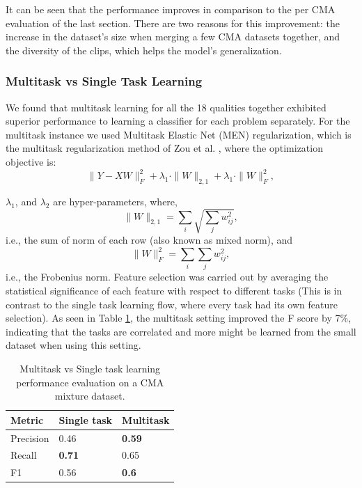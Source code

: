 \documentclass[11pt,twocolumn,varwidth=true,a4paper,fleqn]{article}
\begin{document}
It can be seen that the performance improves in comparison to the
per CMA evaluation of the last section. There are two reasons for this improvement: the increase in the dataset's size when merging a few CMA datasets together, and the diversity of the clips, which helps the model's
generalization.
\subsubsection{Multitask vs Single Task Learning}
We found that multitask learning for all the 18 qualities together exhibited superior 
performance to learning a classifier for each problem separately. For the
multitask instance we used Multitask Elastic Net (MEN) regularization, which is
the multitask regularization method of Zou et al. \cite{Zou}, where the
optimization objective is:
\\
\begin{equation}\label{eq:MEN}
	\|Y - XW\|^2_F+\lambda_1\cdot\|W\|_{2,1}+\lambda_1\cdot\|W\|^2_F,
\end{equation}    
  
$\lambda_1$, and $\lambda_2$ are hyper-parameters, where,
\\
\begin{equation*}
        \|W\|_{2,1} = \sum_i \sqrt{\sum_j w_{ij}^2},
\end{equation*} 
    i.e., the sum of norm of each row (also known as mixed norm), and 
\begin{equation*}
        \|W\|^2_F = \sum_i{\sum_j w_{ij}^2},
\end{equation*}     
	i.e., the Frobenius norm. 
Feature selection was carried out by averaging the statistical significance of
each feature with respect to different tasks (This is in contrast to the single
task learning flow, where every task had its own feature selection). As seen in
Table \ref{MultitaskVsSeparated}, the multitask setting improved the F score by
7\%, indicating that the tasks are correlated and more might be learned
from the small dataset when using this setting.	
 	\begin{table}[ht]
	  	\centering
		\begin{tabular}{|p{1.8cm}|p{1.8cm}|p{1.8cm}|}
		\hline
		Metric&Single task&Multitask\\\hline
		Precision&0.46&\textbf{0.59}\\\hline
		Recall&\textbf{0.71}&0.65\\\hline
		F1&0.56&\textbf{0.6}\\\hline
		\end{tabular}
		\caption{Multitask vs Single task learning performance evaluation on a CMA mixture
		dataset.}
	   \label{MultitaskVsSeparated}
	\end{table}
\end{document}
